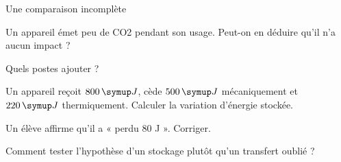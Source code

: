 \par\noindent\begin{minipage}{\linewidth}
\begin{exercice}[3]{Une comparaison incomplète}
\begin{questions}
\item Un appareil émet peu de CO2 pendant son usage. Peut-on en déduire qu’il n’a aucun impact ?
\item Quels postes ajouter ?
\end{questions}
\end{exercice}
\end{minipage}
\label{defi-ex-12}
\begin{questions}
\item Un appareil reçoit $800\unite J$, cède $500\unite J$ mécaniquement et $220\unite J$ thermiquement. Calculer la variation d’énergie stockée.
\item Un élève affirme qu’il a « perdu 80 J ». Corriger.
\item Comment tester l’hypothèse d’un stockage plutôt qu’un transfert oublié ?
\end{questions}
\pcGrille
